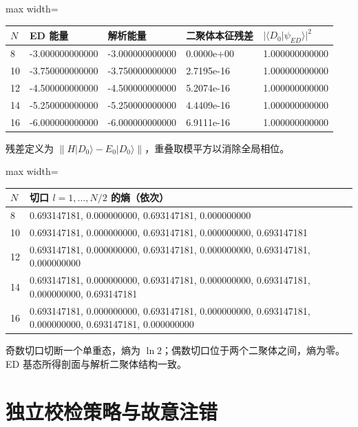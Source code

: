 \documentclass[zihao=5,a4paper]{ctexart}
\begin{document}
\begin{center}
\small
\begin{adjustbox}{max width=\linewidth}
\begin{tabular}{lllll}
\toprule
$N$ & ED 能量 & 解析能量 & 二聚体本征残差 & $|\langle D_0|\psi_{ED}\rangle|^2$ \\
\midrule
8 & -3.000000000000 & -3.000000000000 & 0.0000e+00 & 1.000000000000 \\
10 & -3.750000000000 & -3.750000000000 & 2.7195e-16 & 1.000000000000 \\
12 & -4.500000000000 & -4.500000000000 & 5.2074e-16 & 1.000000000000 \\
14 & -5.250000000000 & -5.250000000000 & 4.4409e-16 & 1.000000000000 \\
16 & -6.000000000000 & -6.000000000000 & 6.9111e-16 & 1.000000000000 \\
\bottomrule
\end{tabular}
\end{adjustbox}
\end{center}

残差定义为 $\|H|D_0\rangle-E_0|D_0\rangle\|$，重叠取模平方以消除全局相位。


\begin{center}
\small
\begin{adjustbox}{max width=\linewidth}
\begin{tabular}{ll}
\toprule
$N$ & 切口 $l=1,\ldots,N/2$ 的熵（依次） \\
\midrule
8 & 0.693147181, 0.000000000, 0.693147181, 0.000000000 \\
10 & 0.693147181, 0.000000000, 0.693147181, 0.000000000, 0.693147181 \\
12 & 0.693147181, 0.000000000, 0.693147181, 0.000000000, 0.693147181, 0.000000000 \\
14 & 0.693147181, 0.000000000, 0.693147181, 0.000000000, 0.693147181, 0.000000000, 0.693147181 \\
16 & 0.693147181, 0.000000000, 0.693147181, 0.000000000, 0.693147181, 0.000000000, 0.693147181, 0.000000000 \\
\bottomrule
\end{tabular}
\end{adjustbox}
\end{center}

奇数切口切断一个单重态，熵为 $\ln2$；偶数切口位于两个二聚体之间，熵为零。ED 基态所得剖面与解析二聚体结构一致。


\section{独立校检策略与故意注错}
\end{document}
